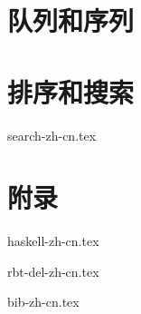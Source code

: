 \documentclass[UTF8, a4paper,twoside]{book} %
\begin{document}





\part{队列和序列}




\part{排序和搜索}


{search-zh-cn.tex}

\part{附录}
\appendix
\noappendicestocpagenum
\addappheadtotoc



{haskell-zh-cn.tex}

{rbt-del-zh-cn.tex}

{bib-zh-cn.tex}

%

\printindex
\end{document}
